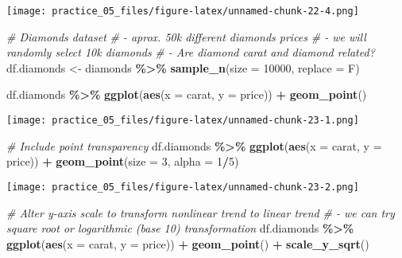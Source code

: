 \documentclass[
]{article}
\newenvironment{Shaded}{\begin{snugshade}}{\end{snugshade}}
\newcommand{\AttributeTok}[1]{\textcolor[rgb]{0.13,0.29,0.53}{#1}}
\newcommand{\CommentTok}[1]{\textcolor[rgb]{0.56,0.35,0.01}{\textit{#1}}}
\newcommand{\DecValTok}[1]{\textcolor[rgb]{0.00,0.00,0.81}{#1}}
\newcommand{\FunctionTok}[1]{\textcolor[rgb]{0.13,0.29,0.53}{\textbf{#1}}}
\newcommand{\NormalTok}[1]{#1}
\newcommand{\OtherTok}[1]{\textcolor[rgb]{0.56,0.35,0.01}{#1}}
\newcommand{\SpecialCharTok}[1]{\textcolor[rgb]{0.81,0.36,0.00}{\textbf{#1}}}
\begin{document}
\texttt{[image: practice\_05\_files/figure-latex/unnamed-chunk-22-4.png]}

\begin{Shaded}
\begin{Highlighting}[]
\CommentTok{\# Diamonds dataset }
\CommentTok{\#  {-} aprox. 50k different diamonds prices}
\CommentTok{\#  {-} we will randomly select 10k diamonds}
\CommentTok{\#  {-} Are diamond carat and diamond related?}
\NormalTok{df.diamonds }\OtherTok{\textless{}{-}}\NormalTok{ diamonds }\SpecialCharTok{\%\textgreater{}\%} \FunctionTok{sample\_n}\NormalTok{(}\AttributeTok{size =} \DecValTok{10000}\NormalTok{, }\AttributeTok{replace =}\NormalTok{ F)}

\NormalTok{df.diamonds }\SpecialCharTok{\%\textgreater{}\%} 
  \FunctionTok{ggplot}\NormalTok{(}\FunctionTok{aes}\NormalTok{(}\AttributeTok{x =}\NormalTok{ carat,}
             \AttributeTok{y =}\NormalTok{ price)) }\SpecialCharTok{+}
  \FunctionTok{geom\_point}\NormalTok{()}
\end{Highlighting}
\end{Shaded}

\texttt{[image: practice\_05\_files/figure-latex/unnamed-chunk-23-1.png]}

\begin{Shaded}
\begin{Highlighting}[]
\CommentTok{\# Include point transparency }
\NormalTok{df.diamonds }\SpecialCharTok{\%\textgreater{}\%} 
  \FunctionTok{ggplot}\NormalTok{(}\FunctionTok{aes}\NormalTok{(}\AttributeTok{x =}\NormalTok{ carat,}
             \AttributeTok{y =}\NormalTok{ price)) }\SpecialCharTok{+}
  \FunctionTok{geom\_point}\NormalTok{(}\AttributeTok{size =} \DecValTok{3}\NormalTok{,}
             \AttributeTok{alpha =} \DecValTok{1}\SpecialCharTok{/}\DecValTok{5}\NormalTok{)}
\end{Highlighting}
\end{Shaded}

\texttt{[image: practice\_05\_files/figure-latex/unnamed-chunk-23-2.png]}

\begin{Shaded}
\begin{Highlighting}[]
\CommentTok{\# Alter y{-}axis scale to transform nonlinear trend to linear trend}
\CommentTok{\# {-} we can try square root or logarithmic (base 10) transformation}
\NormalTok{df.diamonds }\SpecialCharTok{\%\textgreater{}\%} 
  \FunctionTok{ggplot}\NormalTok{(}\FunctionTok{aes}\NormalTok{(}\AttributeTok{x =}\NormalTok{ carat,}
             \AttributeTok{y =}\NormalTok{ price)) }\SpecialCharTok{+}
  \FunctionTok{geom\_point}\NormalTok{() }\SpecialCharTok{+}
  \FunctionTok{scale\_y\_sqrt}\NormalTok{()}
\end{Highlighting}
\end{Shaded}
\end{document}
